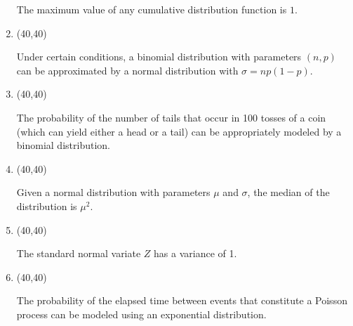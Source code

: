 \documentclass[12pt,twoside]{article}
\newcommand{\?}{\stackrel{?}{=}}
\newcommand{\gr}{\color{green!40!black}}
\begin{document}
\begin{enumerate}[\bf (i)]
    \begin{minipage}{.85\linewidth}
      The maximum value of any cumulative distribution function is $1$.
     \end{minipage}  
  \smallskip  
\item \hfill
  \begin{minipage}{.1\linewidth}
    \framebox(40,40){\gr } %
  \end{minipage}\quad
  \begin{minipage}{.85\linewidth}
    Under certain conditions, a binomial distribution with parameters $(n,p)$ can be approximated by a normal
    distribution with $\sigma = np(1-p)$.
  \end{minipage}  
  \smallskip
\item \hfill
  \begin{minipage}{.1\linewidth}
    \framebox(40,40){ \gr }%
  \end{minipage}\quad
  \begin{minipage}{.85\linewidth}
    The probability of the number of tails that occur in 100 tosses of a coin (which can yield either a head or a tail)
    can be appropriately modeled by a binomial distribution.
  \end{minipage}
  \smallskip
  \item \hfill
  \begin{minipage}{.1\linewidth}
    \framebox(40,40){\gr  } %
  \end{minipage}\quad
  \begin{minipage}{.85\linewidth}
    Given a normal distribution with parameters $\mu$ and $\sigma$, the median of the distribution is $\mu^{2}$.
  \end{minipage}
  \smallskip   
  \item \hfill
    \begin{minipage}{.1\linewidth}
      \framebox(40,40){\gr } %
    \end{minipage}\quad
    \begin{minipage}{.85\linewidth}
      The standard normal variate $Z$ has a variance of 1.
    \end{minipage}
  \smallskip
  \item \hfill
    \begin{minipage}{.1\linewidth}
      \framebox(40,40){\gr } %
    \end{minipage}\quad
    \begin{minipage}{.85\linewidth}
      The probability of the elapsed time between events that constitute a Poisson process can be modeled using an exponential distribution.
    \end{minipage}

    
  \end{enumerate}
\end{document}
